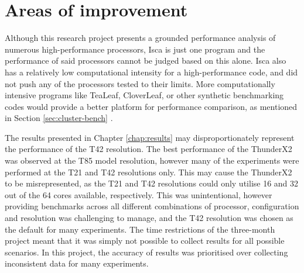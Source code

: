 \documentclass[a4paper,11pt]{report}
\begin{document}
\section{Areas of improvement}
Although this research project presents a grounded performance analysis of numerous high-performance processors, Isca is just one program and the performance of said processors cannot be judged based on this alone. Isca also has a relatively low computational intensity for a high-performance code, and did not push any of the processors tested to their limits. More computationally intensive programs like TeaLeaf, CloverLeaf, or other synthetic benchmarking codes would provide a better platform for performance comparison, as mentioned in Section \ref{sec:cluster-bench} \cite{mcintosh2017tealeaf, mallinson2013cloverleaf}.
\par
The results presented in Chapter \ref{chap:results} may disproportionately represent the performance of the T42 resolution. The best performance of the ThunderX2 was observed at the T85 model resolution, however many of the experiments were performed at the T21 and T42 resolutions only. This may cause the ThunderX2 to be misrepresented, as the T21 and T42 resolutions could only utilise 16 and 32 out of the 64 cores available, respectively. This was unintentional, however providing benchmarks across all different combinations of processor, configuration and resolution was challenging to manage, and the T42 resolution was chosen as the default for many experiments. The time restrictions of the three-month project meant that it was simply not possible to collect results for all possible scenarios. In this project, the accuracy of results was prioritised over collecting inconsistent data for many experiments. 

\end{document}
